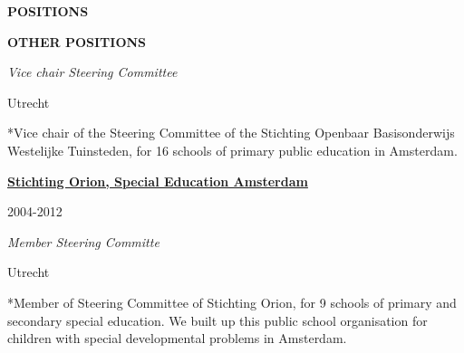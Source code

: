 \documentclass[
  16,
]{article}
\begin{document}
\begin{large}{\bf POSITIONS}
\begin{large}{\bf OTHER POSITIONS}
  \begin{multicols}{2}
    \begin{flushleft}\textit{Vice chair Steering Committee}\end{flushleft}
    \begin{flushright}Utrecht\end{flushright}\end
  {multicols}
\end{large}
\vspace{-0.16cm}

*Vice chair of the Steering Committee of the Stichting Openbaar
Basisonderwijs Westelijke Tuinsteden, for 16 schools of primary public
education in Amsterdam.

\vspace{7pt}

\begin{large}
  \begin{multicols}{2}
    \begin{flushleft}{\bf \href{https://www.nji.nl/}{Stichting Orion, Special Education Amsterdam}}\end{flushleft}
    \begin{flushright}2004-2012\end{flushright}
  \end{multicols}
  \vspace{-0.17cm}
  \begin{multicols}{2}
    \begin{flushleft}\textit{Member Steering Committe}\end{flushleft}
    \begin{flushright}Utrecht\end{flushright}\end
  {multicols}
\end{large}
\vspace{-0.16cm}

*Member of Steering Committee of Stichting Orion, for 9 schools of
primary and secondary special education. We built up this public school
organisation for children with special developmental problems in
Amsterdam.

\vspace{7pt}


\end{large}
\end{document}
